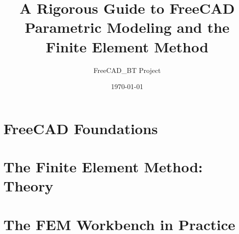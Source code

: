 \documentclass[11pt,openright,twoside]{book}
\title{\Huge\bfseries A Rigorous Guide to FreeCAD\\[0.4em]
       \Large Parametric Modeling and the Finite Element Method}
\author{FreeCAD\_BT Project}
\date{\today}
\begin{document}
\frontmatter
\maketitle



\tableofcontents
\listoffigures
\listoftables

\mainmatter

\part{FreeCAD Foundations}





\part{The Finite Element Method: Theory}







\part{The FEM Workbench in Practice}





\backmatter
\appendix




\end{document}
